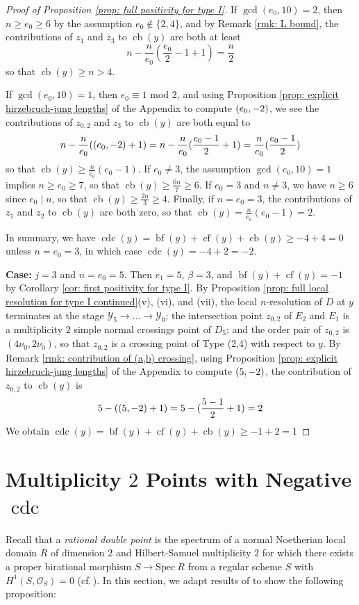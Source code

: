 \documentclass[12pt]{amsart}
\numberwithin{equation}{section}
\theoremstyle{definition}
\renewcommand{\O}{\mathcal{O}}
\newcommand{\Spec}{\mathrm{Spec} \ }
\newcommand{\Y}{\mathcal{Y}}
\let\L\relax
\DeclareMathOperator{\blf}{bf}
\DeclareMathOperator{\cf}{cf}
\DeclareMathOperator{\cb}{cb}
\DeclareMathOperator{\cdc}{cdc}
\DeclareMathOperator{\L}{L}
\begin{document}
\begin{proof}[Proof of Proposition \ref{prop: full positivity for type I}]
    If $\gcd(e_0,10)=2$, then $n\geq e_0\geq 6$ by the assumption $e_0\not\in\{2,4\}$, and by Remark \ref{rmk: L bound}, the contributions of $z_1$ and $z_3$ to $\cb(y)$ are both at least 
    \[n-\frac{n}{e_0}(\frac{e_0}{2}-1+1)=\frac{n}{2}\] so that $\cb(y)\geq n>4$.
        
    If $\gcd(e_0,10)=1$, then $e_0\equiv 1$ mod $2$, and using Proposition \ref{prop: explicit hirzebruch-jung lengths} of the Appendix to compute $\L(e_0,-2)$, we see the contributions of $z_{0,2}$ and $z_3$ to $\cb(y)$ are both equal to
    \[n-\frac{n}{e_0}(\L(e_0,-2)+1)=n-\frac{n}{e_0}(\frac{e_0-1}{2}+1)=\frac{n}{e_0}(\frac{e_0-1}{2})\]
    so that $\cb(y)\geq \frac{n}{e_0}(e_0-1)$. If $e_0\neq 3$, the assumption $\gcd(e_0,10)=1$ implies $n\geq e_0\geq 7$, so that $\cb(y)\geq\frac{6n}{7}\geq 6$. If $e_0=3$ and $n\neq 3$, we have $n\geq 6$ since $e_0\mid n$, so that $\cb(y)\geq\frac{2n}{3}\geq 4$. Finally, if $n=e_0=3$, the contributions of $z_1$ and $z_2$ to $\cb(y)$ are both zero, so that $\cb(y)=\frac{n}{e_0}(e_0-1)=2$.  
    
    In summary, we have $\cdc(y)=\blf(y)+\cf(y)+\cb(y)\geq -4+4=0$ unless $n=e_0=3$, in which case $\cdc(y)=-4+2=-2$.
    
    \textbf{Case:} $j=3$ and $n=e_0=5$. Then $e_1=5$, $\beta=3$, and $\blf(y)+\cf(y)=-1$ by Corollary \ref{cor: first positivity for type I}.  By Proposition \ref{prop: full local resolution for type I continued}(v), (vi), and (vii), the local $n$-resolution of $D$ at $y$ terminates at the stage $\Y_5\to...\to\Y_0$; the intersection point $z_{0,2}$ of $E_2$ and $E_1$ is a multiplicity $2$ simple normal crossings point of $D_5$; and the order pair of $z_{0,2}$ is $(4\nu_0,2\nu_0)$, so that $z_{0,2}$ is a crossing point of Type (2,4) with respect to $y$. By Remark \ref{rmk: contribution of (a,b) crossing}, using Proposition \ref{prop: explicit hirzebruch-jung lengths} of the Appendix to compute $\L(5,-2)$, the contribution of $z_{0,2}$ to $\cb(y)$ is
    \[5-(\L(5,-2)+1)=5-(\frac{5-1}{2}+1)=2\]
    We obtain $\cdc(y)=\blf(y)+\cf(y)+\cb(y)\geq-1+2=1$
\end{proof}


\section{Multiplicity $2$ Points with Negative $\cdc$}\label{section 5}

Recall that a \textit{rational double point} is the spectrum of a normal Noetherian local domain $R$ of dimension $2$ and Hilbert-Samuel multiplicity $2$ for which there exists a proper birational morphism $S\to\Spec R$ from a regular scheme $S$ with $H^1(S,\O_S)=0$ (cf.\,\cite[Definition 1.1]{Lip69}).
In this section, we adapt results of \cite[Section 24]{Lip69} to show the following proposition:
\end{document}

